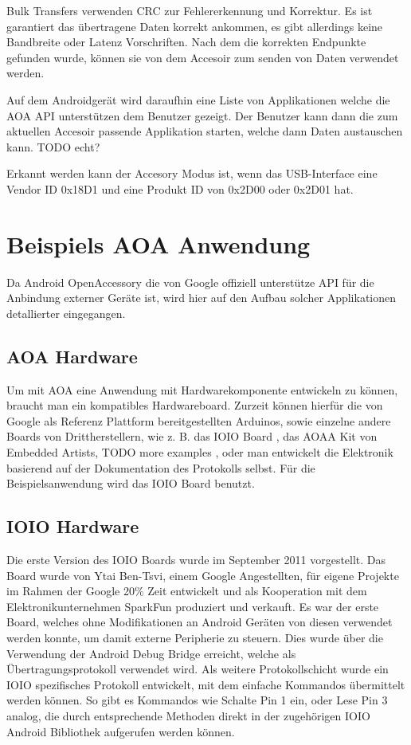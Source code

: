 \documentclass[12pt,journal,compsoc]{IEEEtran}
\begin{document}
Bulk Transfers verwenden CRC zur Fehlererkennung und Korrektur. Es ist garantiert das übertragene Daten korrekt ankommen, es gibt allerdings keine Bandbreite oder Latenz Vorschriften.
\cite{usbbulk}
Nach dem die korrekten Endpunkte gefunden wurde, können sie von dem Accesoir zum senden von Daten verwendet werden.

Auf dem Androidgerät wird daraufhin eine Liste von Applikationen welche die AOA API unterstützen dem Benutzer gezeigt. Der Benutzer kann dann die zum aktuellen Accesoir passende Applikation starten, welche dann Daten austauschen kann. TODO echt?


Erkannt werden kann der Accesory Modus ist, wenn das USB-Interface eine Vendor ID 0x18D1 und eine Produkt ID von 0x2D00 oder 0x2D01 hat. 

\section{Beispiels AOA Anwendung}
Da Android OpenAccessory die von Google offiziell unterstütze API für die Anbindung externer Geräte ist, wird hier auf den Aufbau solcher Applikationen detallierter eingegangen.
\subsection{AOA Hardware}
Um mit AOA eine Anwendung mit Hardwarekomponente entwickeln zu können, braucht man ein kompatibles Hardwareboard.
Zurzeit können hierfür die von Google als Referenz Plattform bereitgestellten Arduinos, sowie einzelne andere Boards von Drittherstellern, wie z. B. das IOIO Board \cite{ioio}, das AOAA Kit von Embedded Artists\cite{aoaa},  TODO more examples , oder man entwickelt die Elektronik basierend auf der Dokumentation des Protokolls selbst\cite{aoaprotocol2}.
Für die Beispielsanwendung wird das IOIO Board benutzt.

\subsection{IOIO Hardware}
Die erste Version des IOIO Boards wurde im September 2011 vorgestellt. Das Board wurde von Ytai Ben-Tsvi, einem Google Angestellten, für eigene Projekte im Rahmen der Google 20\% Zeit entwickelt und als Kooperation mit dem Elektronikunternehmen SparkFun produziert und verkauft.
Es war der erste Board, welches ohne Modifikationen an Android Geräten von diesen verwendet werden konnte, um damit externe Peripherie zu steuern.
Dies wurde über die Verwendung der Android Debug Bridge erreicht, welche als Übertragungsprotokoll verwendet wird.
Als weitere Protokollschicht wurde ein IOIO spezifisches Protokoll entwickelt, mit dem einfache Kommandos übermittelt werden können.
So gibt es Kommandos wie \glqq Schalte Pin 1 ein\grqq, oder \glqq Lese Pin 3 analog\grqq, die durch entsprechende Methoden direkt in der zugehörigen IOIO Android Bibliothek aufgerufen werden können.
\end{document}

